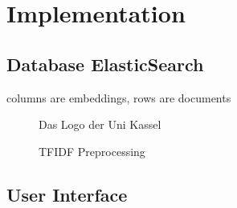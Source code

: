 \chapter{Implementation}\label{ch:implementation}

\section{Database ElasticSearch}\label{subsec:db}
columns are embeddings, rows are documents

\begin{figure}[htp] %
    \centering
    
    \caption{Das Logo der Uni Kassel}
    \label{fig:pdf2db}
\end{figure}

\begin{figure}[htp] %
    \centering
    
    \caption{TFIDF Preprocessing}
    \label{fig:preprocessing}
\end{figure}

\section{User Interface}\label{sec:ui}
